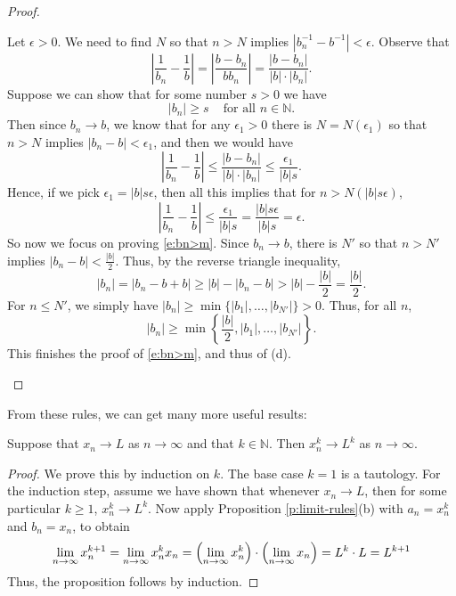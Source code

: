 \documentclass[11pt,dvipsnames]{book}
\numberwithin{equation}{section} %
\numberwithin{figure}{section} %
\numberwithin{table}{section} %
\begin{document}
\begin{proof}
\begin{enumerate}[label=(\alph*)]
Let $\epsilon>0$. We need to find $N$ so that $n > N$ implies $|b_{n}^{-1}-b^{-1}|<\epsilon$. Observe that 
\[
\left|\frac{1}{b_{n}}-\frac{1}{b}\right|
=\left|\frac{b-b_{n}}{bb_{n}}\right|
=\frac{|b-b_{n}|}{|b|\cdot |b_{n}|}.
\]
Suppose we can show that for some number $s>0$ we have
\begin{equation}
\label{e:bn>m}
|b_{n}|\geq s \;\;\; \mbox{ for all }n\in\mathbb{N}.
\end{equation}
 Then since $b_{n}\rightarrow b$, we know that for any $\epsilon_1>0$ there is $N = N(\epsilon_1)$ so that $n > N$ implies $|b_{n}-b|<\epsilon_1$, and then we would have
\[
\left|\frac{1}{b_{n}}-\frac{1}{b}\right|\leq \frac{|b-b_{n}|}{|b|\cdot |b_{n}|}
\leq \frac{\epsilon_1}{|b| s}.
\]
Hence, if we pick $\epsilon_1=|b|s\epsilon$, then all this implies that for $n > N(|b|s\epsilon)$,
\[
\left|\frac{1}{b_{n}}-\frac{1}{b}\right| 
\leq \frac{\epsilon_1}{|b| s}= \frac{|b|s\epsilon}{|b| s}=\epsilon.
\]
So now we focus on proving \eqref{e:bn>m}. Since $b_n\rightarrow b$, there is $N'$ so that $n > N'$ implies $|b_{n}-b|<\frac{|b|}{2}$. Thus, by the reverse triangle inequality,
\[
|b_{n}|
=|b_{n}-b+b|
\geq |b|-|b_{n}-b|
>|b|-\frac{|b|}{2} = \frac{|b|}{2}.
\]
For $n \leq N'$, we simply have $|b_{n}|\geq \min\{|b_{1}|,\dots,|b_{N'}|\}>0$. Thus, for all $n$, 
 \[
|b_{n}|\geq \min\left\{\frac{|b|}{2},|b_{1}|,\dots ,|b_{N'}|\right\}.
\]
This finishes the proof of  \eqref{e:bn>m}, and thus of (d). 



\end{enumerate}
\end{proof}


From these rules, we can get many more useful results:

\begin{proposition}
\label{p:power-lim}
Suppose that $x_n\rightarrow L$ as $n \to \infty$ and that $k \in \mathbb{N}$. Then $x_{n}^{k}\rightarrow L^{k}$ as $n \to \infty$.
\end{proposition}

\begin{proof}
We prove this by induction on $k$. The base case $k=1$ is a tautology. For the induction step, assume we have shown that whenever $x_n\rightarrow L$, then for some particular $k \geq 1$, $x_{n}^{k}\rightarrow L^{k}$. Now apply Proposition \ref{p:limit-rules}(b) with $a_n=x_{n}^{k}$ and $b_{n}=x_{n}$, to obtain
\[
\lim_{n\rightarrow\infty} x_{n}^{k+1}=\lim_{n\rightarrow\infty} x_{n}^{k}x_{n}
=\left(\lim_{n\rightarrow\infty} x_{n}^{k}\right)\cdot\left(\lim_{n\rightarrow\infty} x_{n}\right)
=L^{k}\cdot L = L^{k+1}
\] Thus, the proposition follows by induction. 
\end{proof}
\end{document}
